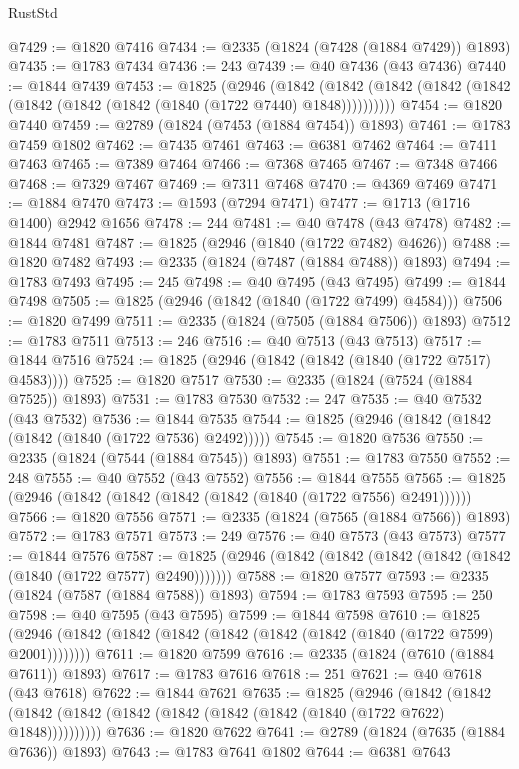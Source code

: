 \begin{lexlean}{RustStd}
\begin{coremodule}
@7429 := @1820 @7416
@7434 := @2335 (@1824 (@7428 (@1884 @7429)) @1893)
@7435 := @1783 @7434
@7436 := 243
@7439 := @40 @7436 (@43 @7436)
@7440 := @1844 @7439
@7453 := @1825
    (@2946
      (@1842 (@1842 (@1842 (@1842 (@1842 (@1842 (@1842 (@1842 (@1840 (@1722 @7440) @1848))))))))))
@7454 := @1820 @7440
@7459 := @2789 (@1824 (@7453 (@1884 @7454)) @1893)
@7461 := @1783 @7459 @1802
@7462 := @7435 @7461
@7463 := @6381 @7462
@7464 := @7411 @7463
@7465 := @7389 @7464
@7466 := @7368 @7465
@7467 := @7348 @7466
@7468 := @7329 @7467
@7469 := @7311 @7468
@7470 := @4369 @7469
@7471 := @1884 @7470
@7473 := @1593 (@7294 @7471)
@7477 := @1713 (@1716 @1400) @2942 @1656
@7478 := 244
@7481 := @40 @7478 (@43 @7478)
@7482 := @1844 @7481
@7487 := @1825 (@2946 (@1840 (@1722 @7482) @4626))
@7488 := @1820 @7482
@7493 := @2335 (@1824 (@7487 (@1884 @7488)) @1893)
@7494 := @1783 @7493
@7495 := 245
@7498 := @40 @7495 (@43 @7495)
@7499 := @1844 @7498
@7505 := @1825 (@2946 (@1842 (@1840 (@1722 @7499) @4584)))
@7506 := @1820 @7499
@7511 := @2335 (@1824 (@7505 (@1884 @7506)) @1893)
@7512 := @1783 @7511
@7513 := 246
@7516 := @40 @7513 (@43 @7513)
@7517 := @1844 @7516
@7524 := @1825 (@2946 (@1842 (@1842 (@1840 (@1722 @7517) @4583))))
@7525 := @1820 @7517
@7530 := @2335 (@1824 (@7524 (@1884 @7525)) @1893)
@7531 := @1783 @7530
@7532 := 247
@7535 := @40 @7532 (@43 @7532)
@7536 := @1844 @7535
@7544 := @1825 (@2946 (@1842 (@1842 (@1842 (@1840 (@1722 @7536) @2492)))))
@7545 := @1820 @7536
@7550 := @2335 (@1824 (@7544 (@1884 @7545)) @1893)
@7551 := @1783 @7550
@7552 := 248
@7555 := @40 @7552 (@43 @7552)
@7556 := @1844 @7555
@7565 := @1825 (@2946 (@1842 (@1842 (@1842 (@1842 (@1840 (@1722 @7556) @2491))))))
@7566 := @1820 @7556
@7571 := @2335 (@1824 (@7565 (@1884 @7566)) @1893)
@7572 := @1783 @7571
@7573 := 249
@7576 := @40 @7573 (@43 @7573)
@7577 := @1844 @7576
@7587 := @1825 (@2946 (@1842 (@1842 (@1842 (@1842 (@1842 (@1840 (@1722 @7577) @2490)))))))
@7588 := @1820 @7577
@7593 := @2335 (@1824 (@7587 (@1884 @7588)) @1893)
@7594 := @1783 @7593
@7595 := 250
@7598 := @40 @7595 (@43 @7595)
@7599 := @1844 @7598
@7610 := @1825 (@2946 (@1842 (@1842 (@1842 (@1842 (@1842 (@1842 (@1840 (@1722 @7599) @2001))))))))
@7611 := @1820 @7599
@7616 := @2335 (@1824 (@7610 (@1884 @7611)) @1893)
@7617 := @1783 @7616
@7618 := 251
@7621 := @40 @7618 (@43 @7618)
@7622 := @1844 @7621
@7635 := @1825
    (@2946
      (@1842 (@1842 (@1842 (@1842 (@1842 (@1842 (@1842 (@1842 (@1840 (@1722 @7622) @1848))))))))))
@7636 := @1820 @7622
@7641 := @2789 (@1824 (@7635 (@1884 @7636)) @1893)
@7643 := @1783 @7641 @1802
@7644 := @6381 @7643

\end{coremodule}
\end{lexlean}
